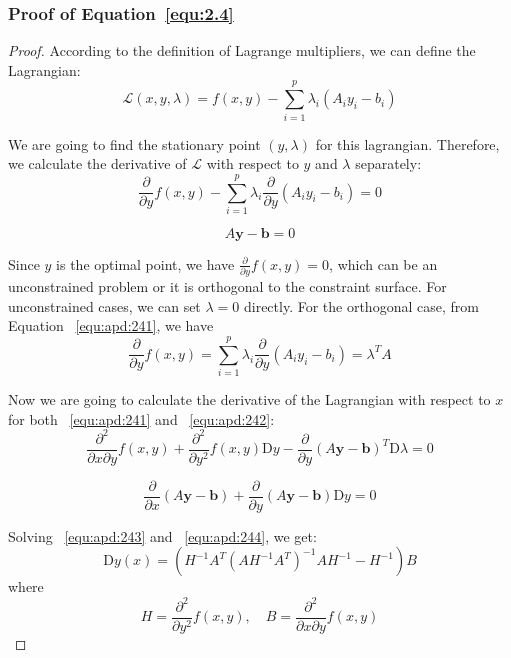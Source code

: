 \subsubsection{Proof of Equation~\ref{equ:2.4} \citep{SG:19}}
\label{appendix:equ2.4}
\begin{proof}
    According to the definition of Lagrange multipliers, we can define the Lagrangian:
    $$
    \mathcal{L}(x, y, \lambda)=f(x, y)-\sum_{i=1}^{p} \lambda_{i} (A_{i}y_i - b_i)
    $$
    \par We are going to find the stationary point $(y, \lambda)$ for this lagrangian. Therefore, we calculate the derivative of $\mathcal{L}$ with respect to $y$ and $\lambda$ separately: 
    \begin{equation}
        \label{equ:apd:241}
        \frac{\partial}{\partial y} f(x,y) - \sum_{i=1}^{p} \lambda_{i} \frac{\partial}{\partial y}(A_{i}y_i - b_i) = 0
    \end{equation}
    
    \begin{equation}
        \label{equ:apd:242}
        A \boldsymbol{y} - \boldsymbol{b} = 0
    \end{equation}
    \par Since $y$ is the optimal point, we have $\frac{\partial}{\partial y} f(x,y) = 0$, which can be an unconstrained problem or it is orthogonal to the constraint surface. For unconstrained cases, we can set $\lambda = 0$ directly. For the orthogonal case, from Equation ~\ref{equ:apd:241}, we have
    $$
    \frac{\partial}{\partial y} f(x,y) = \sum_{i=1}^{p} \lambda_{i} \frac{\partial}{\partial y}(A_{i}y_i - b_i) = \lambda^T A
    $$
    \par Now we are going to calculate the derivative of the Lagrangian with respect to $x$ for both ~\ref{equ:apd:241} and ~\ref{equ:apd:242}: 
    \begin{equation}
        \label{equ:apd:243}
        \frac{\partial^2}{\partial x \partial y} f(x, y) +\frac{\partial^2}{\partial y^2} f(x,y) \mathrm{D} y-\frac{\partial}{\partial y} (A\boldsymbol{y}-\boldsymbol{b})^T \mathrm{D} \lambda = 0 
    \end{equation}

    \begin{equation}
        \label{equ:apd:244}
        \frac{\partial}{\partial x} (A\boldsymbol{y}-\boldsymbol{b}) + \frac{\partial}{\partial y} (A\boldsymbol{y}-\boldsymbol{b}) \mathrm{D}y = 0
    \end{equation}
    \par Solving ~\ref{equ:apd:243} and ~\ref{equ:apd:244}, we get:
    $$
    \mathrm{D} y(x)=\left(H^{-1} A^{T}\left(A H^{-1} A^{T}\right)^{-1} A H^{-1}-H^{-1}\right) B
    $$
    where 
    $$
    H = \frac{\partial^2}{\partial y^2} f(x,y) ,\quad
    B = \frac{\partial^2}{\partial x \partial y} f(x,y)
    $$
\end{proof}

